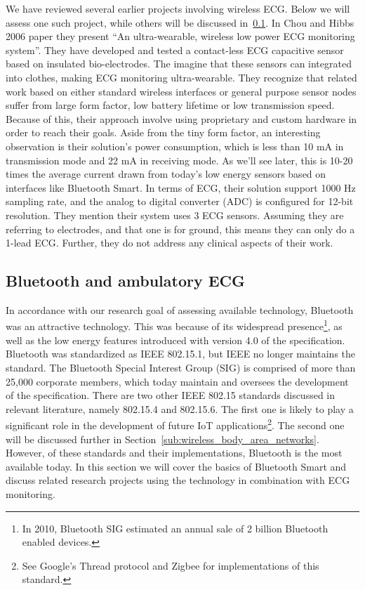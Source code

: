 We have reviewed several earlier projects involving wireless ECG. Below we will assess one such project, while others will be discussed in~\ref{sub:bluetooth}. In Chou and Hibbs 2006 paper \cite{ChulsungPark:2006tf} they present ``An ultra-wearable, wireless low power ECG monitoring system''. They have developed and tested a contact-less ECG capacitive sensor based on insulated bio-electrodes. The imagine that these sensors can integrated into clothes, making ECG monitoring ultra-wearable. They recognize that related work based on either standard wireless interfaces or general purpose sensor nodes suffer from large form factor, low battery lifetime or low transmission speed. Because of this, their approach involve using proprietary and custom hardware in order to reach their goals. Aside from the tiny form factor, an interesting observation is their solution's power consumption, which is less than 10 mA in transmission mode and 22 mA in receiving mode. As we'll see later, this is 10-20 times the average current drawn from today's low energy sensors based on interfaces like Bluetooth Smart. In terms of ECG, their solution support 1000 Hz sampling rate, and the analog to digital converter (ADC) is configured for 12-bit resolution. They mention their system uses 3 ECG sensors. Assuming they are referring to electrodes, and that one is for ground, this means they can only do a 1-lead ECG. Further, they do not address any clinical aspects of their work.


\subsection{Bluetooth and ambulatory ECG} %
\label{sub:bluetooth}

In accordance with our research goal of assessing available technology, Bluetooth was an attractive technology. This was because of its widespread presence\footnote{ In 2010, Bluetooth SIG estimated an annual sale of 2 billion Bluetooth enabled devices.}, as well as the low energy features introduced with version 4.0 of the specification. Bluetooth was standardized as IEEE 802.15.1, but IEEE no longer maintains the standard. The Bluetooth Special Interest Group (SIG) is comprised of more than 25,000 corporate members, which today maintain and oversees the development of the specification. There are two other IEEE 802.15 standards discussed in relevant literature, namely 802.15.4 and 802.15.6. The first one is likely to play a significant role in the development of future IoT applications\footnote{ See Google's Thread protocol and Zigbee for implementations of this standard.}. The second one will be discussed further in Section~\ref{sub:wireless_body_area_networks}. However, of these standards and their implementations, Bluetooth is the most available today. In this section we will cover the basics of Bluetooth Smart and discuss related research projects using the technology in combination with ECG monitoring.

